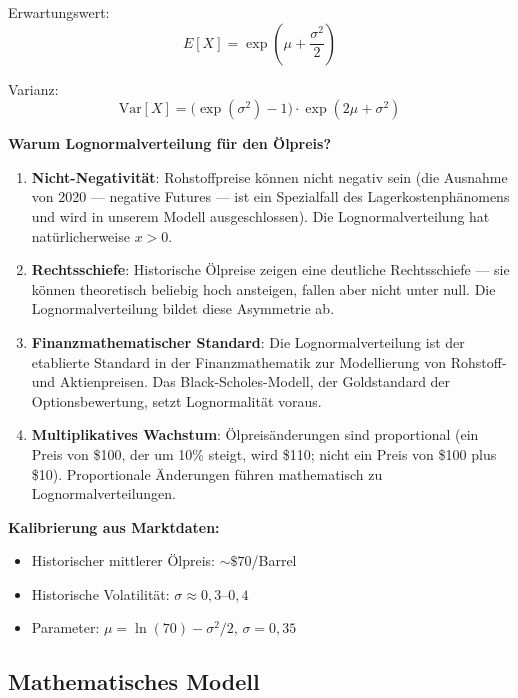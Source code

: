 \documentclass[12pt,a4paper]{article}
\begin{document}
Erwartungswert:
\begin{equation}
E[X] = \exp\!\left(\mu + \frac{\sigma^2}{2}\right)
\end{equation}

Varianz:
\begin{equation}
\text{Var}[X] = \bigl(\exp(\sigma^2) - 1\bigr) \cdot \exp(2\mu + \sigma^2)
\end{equation}

\textbf{Warum Lognormalverteilung für den Ölpreis?}

\begin{enumerate}[label=\arabic*., itemsep=4pt]
  \item \textbf{Nicht-Negativität}: Rohstoffpreise können nicht negativ sein (die Ausnahme von 2020 — negative Futures — ist ein Spezialfall des Lagerkostenphänomens und wird in unserem Modell ausgeschlossen). Die Lognormalverteilung hat natürlicherweise $x > 0$.
  \item \textbf{Rechtsschiefe}: Historische Ölpreise zeigen eine deutliche Rechtsschiefe — sie können theoretisch beliebig hoch ansteigen, fallen aber nicht unter null. Die Lognormalverteilung bildet diese Asymmetrie ab.
  \item \textbf{Finanzmathematischer Standard}: Die Lognormalverteilung ist der etablierte Standard in der Finanzmathematik zur Modellierung von Rohstoff- und Aktienpreisen. Das Black-Scholes-Modell, der Goldstandard der Optionsbewertung, setzt Lognormalität voraus.
  \item \textbf{Multiplikatives Wachstum}: Ölpreisänderungen sind proportional (ein Preis von \$100, der um 10\% steigt, wird \$110; nicht ein Preis von \$100 plus \$10). Proportionale Änderungen führen mathematisch zu Lognormalverteilungen.
\end{enumerate}

\textbf{Kalibrierung aus Marktdaten:}
\begin{itemize}[itemsep=1pt]
  \item Historischer mittlerer Ölpreis: ${\sim}\$70$/Barrel
  \item Historische Volatilität: $\sigma \approx 0{,}3$–$0{,}4$
  \item Parameter: $\mu = \ln(70) - \sigma^2/2$, \; $\sigma = 0{,}35$
\end{itemize}

\subsection{Mathematisches Modell}
\end{document}
